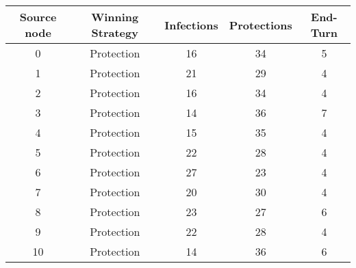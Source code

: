\documentclass[results.tex]{subfiles}
\begin{document}
    \begin{center}
        \begin{tabular}{| c || c | c | c | c |}
            \hline
            {\bfseries Source node} & {\bfseries Winning Strategy} & {\bfseries Infections} & {\bfseries Protections}
            & {\bfseries End-Turn}
            \\  %
            \hline\hline
            0                       & Protection                   & 16                     & 34                      & 5                    \\
            \hline
            1                       & Protection                   & 21                     & 29                      & 4                    \\
            \hline
            2                       & Protection                   & 16                     & 34                      & 4                    \\
            \hline
            3                       & Protection                   & 14                     & 36                      & 7                    \\
            \hline
            4                       & Protection                   & 15                     & 35                      & 4                    \\
            \hline
            5                       & Protection                   & 22                     & 28                      & 4                    \\
            \hline
            6                       & Protection                   & 27                     & 23                      & 4                    \\
            \hline
            7                       & Protection                   & 20                     & 30                      & 4                    \\
            \hline
            8                       & Protection                   & 23                     & 27                      & 6                    \\
            \hline
            9                       & Protection                   & 22                     & 28                      & 4                    \\
            \hline
            10                      & Protection                   & 14                     & 36                      & 6                    \\

\end{tabular}
\end{center}
\end{document}
